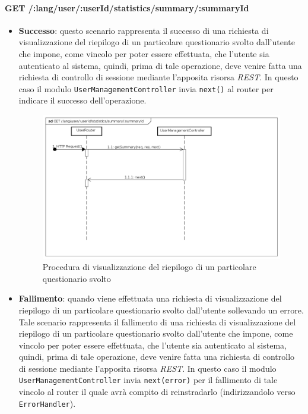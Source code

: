\paragraph{GET /:lang/user/:userId/statistics/summary/:summaryId}
\begin{itemize}
\item \textbf{Successo}: questo scenario rappresenta il successo di una richiesta di visualizzazione del riepilogo di un particolare questionario svolto dall'utente che impone, come vincolo per poter essere effettuata, che l'utente sia autenticato al sistema, quindi, prima di tale operazione, deve venire fatta una richiesta di controllo di sessione mediante l'apposita risorsa \textit{REST}.  
In questo caso il modulo \texttt{UserManagementController} invia \texttt{next()} al router per indicare il successo dell'operazione.
\label{Procedura di visualizzazione del riepilogo di un particolare questionario svolto}
\begin{figure}[ht]
	\centering
	\includegraphics[scale=0.40]{UML/DiagrammiDiSequenza/Back-end/GET_LangUserUserIdStatisticsSummarySummaryIdSuccess.png}
	\caption{Procedura di visualizzazione del riepilogo di un particolare questionario svolto}
\end{figure}
\FloatBarrier
\item \textbf{Fallimento}: quando viene effettuata una richiesta di visualizzazione del riepilogo di un particolare questionario svolto dall'utente sollevando un errore. Tale scenario rappresenta il fallimento di una richiesta di visualizzazione del riepilogo di un particolare questionario svolto dall'utente che impone, come vincolo per poter essere effettuata, che l'utente sia autenticato al sistema, quindi, prima di tale operazione, deve venire fatta una richiesta di controllo di sessione mediante l'apposita risorsa \textit{REST}. In questo caso il modulo \texttt{UserManagementController} invia \texttt{next(error)} per il fallimento di tale vincolo al router il quale avrà compito di reinstradarlo (indirizzandolo verso \texttt{ErrorHandler}).

\end{itemize}
